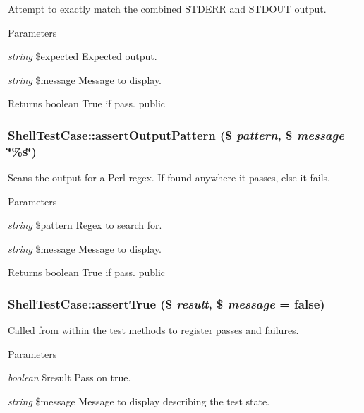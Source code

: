 \label{class_shell_test_case_a9961443a5439f183fad382d7a814ed61}
Attempt to exactly match the combined STDERR and STDOUT output. 
\begin{DoxyParams}{Parameters}
\item[{\em string}]\$expected Expected output. \item[{\em string}]\$message Message to display. \end{DoxyParams}
\begin{DoxyReturn}{Returns}
boolean True if pass.  public 
\end{DoxyReturn}
\hypertarget{class_shell_test_case_aa9bd5bb426cae9cf49bc36994c6b0d78}{
\subsubsection[{assertOutputPattern}]{\setlength{\rightskip}{0pt plus 5cm}ShellTestCase::assertOutputPattern (\$ {\em pattern}, \/  \$ {\em message} = {\ttfamily \char`\"{}\%s\char`\"{}})}}
\label{class_shell_test_case_aa9bd5bb426cae9cf49bc36994c6b0d78}
Scans the output for a Perl regex. If found anywhere it passes, else it fails. 
\begin{DoxyParams}{Parameters}
\item[{\em string}]\$pattern Regex to search for. \item[{\em string}]\$message Message to display. \end{DoxyParams}
\begin{DoxyReturn}{Returns}
boolean True if pass.  public 
\end{DoxyReturn}
\hypertarget{class_shell_test_case_adbfc654af0d720171eaebdf48324df1a}{
\subsubsection[{assertTrue}]{\setlength{\rightskip}{0pt plus 5cm}ShellTestCase::assertTrue (\$ {\em result}, \/  \$ {\em message} = {\ttfamily false})}}
\label{class_shell_test_case_adbfc654af0d720171eaebdf48324df1a}
Called from within the test methods to register passes and failures. 
\begin{DoxyParams}{Parameters}
\item[{\em boolean}]\$result Pass on true. \item[{\em string}]\$message Message to display describing the test state. \end{DoxyParams}
